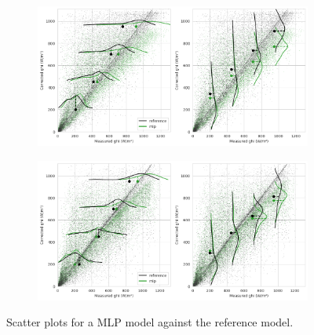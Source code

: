 \begin{figure}[htb!]
    \begin{subfigure}{\columnwidth}
        \includegraphics[width=\columnwidth]{figures/first_study/scatter_plot_mlp_site3_rmse.png}
    \end{subfigure}
\medskip
    \begin{subfigure}{\columnwidth}
        \includegraphics[width=\columnwidth]{figures/first_study/scatter_plot_mlp_site4_rmse.png}
    \end{subfigure}
    \caption[]{Scatter plots for a MLP model against the reference model.}
\end{figure}


